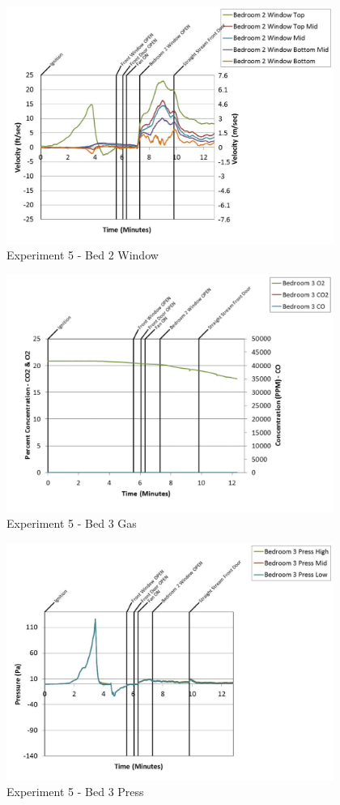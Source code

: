 \documentclass{article}
\begin{document}
\begin{appendices}
	\begin{figure}[h!]
		\centering
		\includegraphics[height=3.05in]{0_Images/Results_Charts/Exp_5_Charts/Bed2Window.pdf}
		\caption{Experiment 5 - Bed 2 Window}
	\end{figure}
 
	\clearpage

	\begin{figure}[h!]
		\centering
		\includegraphics[height=3.05in]{0_Images/Results_Charts/Exp_5_Charts/Bed3Gas.pdf}
		\caption{Experiment 5 - Bed 3 Gas}
	\end{figure}
 

	\begin{figure}[h!]
		\centering
		\includegraphics[height=3.05in]{0_Images/Results_Charts/Exp_5_Charts/Bed3Press.pdf}
		\caption{Experiment 5 - Bed 3 Press}
	\end{figure}
 

\end{appendices}
\end{document}
